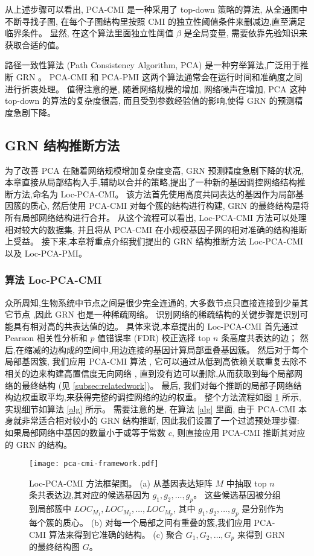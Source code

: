 从上述步骤可以看出, PCA-CMI 是一种采用了 top-down 策略的算法, 
从全通图中不断寻找子图, 在每个子图结构里按照 CMI 的独立性阈值条件来删减边,直至满足临界条件。
显然, 在这个算法里面独立性阈值 $\beta$ 是全局变量, 需要依靠先验知识来获取合适的值。

路径一致性算法 (Path Consistency Algorithm, PCA) 是一种穷举算法,广泛用于推断 GRN 。
PCA-CMI 和 PCA-PMI 这两个算法通常会在运行时间和准确度之间进行折衷处理。
值得注意的是, 
随着网络规模的增加, 网络噪声在增加,
PCA 这种 top-down 的算法的复杂度很高, 而且受到参数经验值的影响,使得 GRN 的预测精度急剧下降。

\subsection{GRN 结构推断方法}
为了改善 PCA 在随着网络规模增加复杂度变高, GRN 预测精度急剧下降的状况, 本章直接从局部结构入手,辅助以合并的策略,提出了一种新的基因调控网络结构推断方法,命名为 Loc-PCA-CMI。
该方法首先使用高度共同表达的基因作为局部基因簇的质心,
然后使用 PCA-CMI 对每个簇的结构进行构建, GRN 的最终结构是将所有局部网络结构进行合并。
从这个流程可以看出, Loc-PCA-CMI 方法可以处理相对较大的数据集,
并且将从 PCA-CMI 在小规模基因子网的相对准确的结构推断上受益。
接下来,本章将重点介绍我们提出的 GRN 结构推断方法 Loc-PCA-CMI 以及 Loc-PCA-PMI。

\subsubsection{算法 Loc-PCA-CMI}

众所周知,生物系统中节点之间是很少完全连通的,
大多数节点只直接连接到少量其它节点 ,因此 GRN 也是一种稀疏网络。
识别网络的稀疏结构的关键步骤是识别可能具有相对高的共表达值的边。
具体来说,本章提出的 Loc-PCA-CMI 首先通过 Pearson 相关性分析和 $p$ 值错误率 (FDR) 校正选择 top $n$ 条高度共表达的边；
然后,在缩减的边构成的空间中,用边连接的基因计算局部重叠基因簇。
然后对于每个局部基因簇, 我们应用 PCA-CMI 算法 ,
它可以通过从低到高依赖关联重复去除不相关的边来构建高置信度无向网络 ,
直到没有边可以删除,从而获取到每个局部网络的最终结构 (见 \ref{subsec:relatedwork})。
最后, 我们对每个推断的局部子网络结构边权重取平均,来获得完整的调控网络的边的权重。
整个方法流程如图 \ref{pca-cmi-fr} 所示,实现细节如算法 \ref{alg} 所示。
需要注意的是,
在算法 \ref{alg} 里面,
由于 PCA-CMI 本身就非常适合相对较小的 GRN 结构推断,
因此我们设置了一个过滤预处理步骤: 如果局部网络中基因的数量小于或等于常数 $c$,
则直接应用 PCA-CMI 推断其对应的 GRN 的结构。
\begin{figure}[!htbp]
    \centering
    \texttt{[image: pca-cmi-framework.pdf]}
    \caption{Loc-PCA-CMI 方法框架图。
    (a) 从基因表达矩阵 $M$ 中抽取 top $n$ 条共表达边,其对应的候选基因为 $g_1,g_2,\ldots,g_{p} $。
    这些候选基因被分组到局部簇中 $LOC_{M_1}, LOC_{M_2},\ldots,LOC_{M_{p}}$,
    其中 $g_1,g_2,\ldots,g_{p}$ 是分别作为每个簇的质心。
    (b) 对每一个局部之间有重叠的簇,我们应用 PCA-CMI 算法来得到它准确的结构。
    (c) 聚合 $G_1, G_2, \ldots, G_p$ 来得到 GRN 的最终结构图 $G$。
    }
    \label{pca-cmi-fr}
\end{figure}


